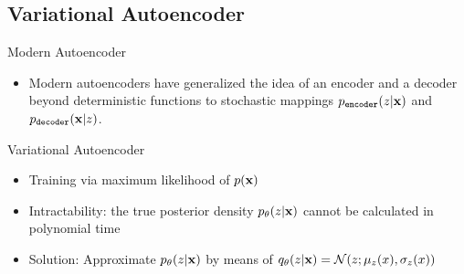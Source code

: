 \documentclass[xcolor=pdftex,dvipsnames,table,mathserif]{beamer}
\begin{document}

\subsection{Variational Autoencoder}

\begin{frame}{Modern Autoencoder}
\begin{itemize}
\item Modern autoencoders have generalized the idea of an encoder and a decoder
beyond deterministic functions to stochastic mappings
$p_{\texttt{encoder}}(z|\mathbf{x})$ and $p_{\texttt{decoder}}(\mathbf{x}|z)$.
\end{itemize}
\end{frame}



\begin{frame}{Variational Autoencoder}
\begin{figure}
\centering
{}
\end{figure}
\begin{itemize}
\item Training via maximum likelihood of $p(\mathbf{x})$
\item Intractability: the true posterior density $p_{\theta}(z|\mathbf{x})$ cannot be calculated in polynomial time%
\item Solution: Approximate $p_\theta(z|\mathbf{x})$ by means of $q_\theta(z|\mathbf{x})=\mathcal{N}(z; \mu_{z}(x),\sigma_{z}(x))$
\end{itemize}
\end{frame}
\end{document}
